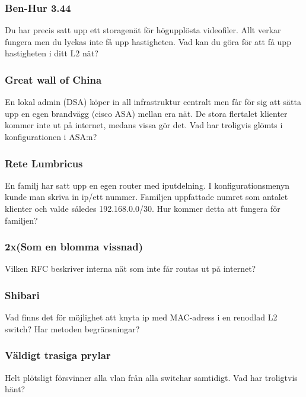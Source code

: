 \documentclass[a4paper]{report}
\begin{document}
\subsubsection{Ben-Hur 3.44}
Du har precis satt upp ett storagenät för högupplösta videofiler. Allt verkar fungera men du lyckas inte få upp hastigheten. Vad kan du göra för att få upp hastigheten i ditt L2 nät?

\subsubsection{Great wall of China}
En lokal admin (DSA) köper in all infrastruktur centralt men får för sig att sätta upp en egen brandvägg (cisco ASA) mellan era nät. De stora flertalet klienter kommer inte ut på internet, medans vissa gör det. Vad har troligvis glömts i konfigurationen i ASA:n? 

\subsubsection{Rete Lumbricus}
En familj har satt upp en egen router med iputdelning. I konfigurationsmenyn kunde man skriva in ip/ett nummer. Familjen uppfattade numret som antalet klienter och valde således 192.168.0.0/30. Hur kommer detta att fungera för familjen?

\subsubsection{2x(Som en blomma vissnad)}
Vilken RFC beskriver interna nät som inte får routas ut på internet?

\subsubsection{Shibari}
Vad finns det för möjlighet att knyta ip med MAC-adress i en renodlad L2 switch? Har metoden begränsningar?

\subsubsection{Väldigt trasiga prylar}
Helt plötsligt försvinner alla vlan från alla switchar samtidigt. Vad har troligtvis hänt?
\end{document}
